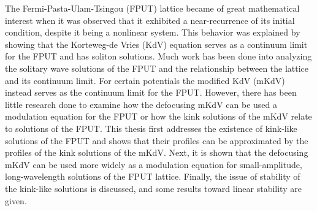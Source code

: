 
The Fermi-Pasta-Ulam-Tsingou (FPUT) lattice became of great mathematical interest when it was observed that it exhibited a near-recurrence of its initial condition, despite it being a nonlinear system. This behavior was explained by showing that the Korteweg-de Vries (KdV) equation serves as a continuum limit for the FPUT and has soliton solutions. Much work has been done into analyzing the solitary wave solutions of the FPUT and the relationship between the lattice and its continuum limit. For certain potentials the modified KdV (mKdV) instead serves as the continuum limit for the FPUT. However, there has been little research done to examine how the defocusing mKdV can be used a modulation equation for the FPUT or how the kink solutions of the mKdV relate to solutions of the FPUT. This thesis first addresses the existence of kink-like solutions of the FPUT and shows that their profiles can be approximated by the profiles of the kink solutions of the mKdV. Next, it is shown that the defocusing mKdV can be used more widely as a modulation equation for small-amplitude, long-wavelength solutions of the FPUT lattice. Finally, the issue of stability of the kink-like solutions is discussed, and some results toward linear stability are given.
